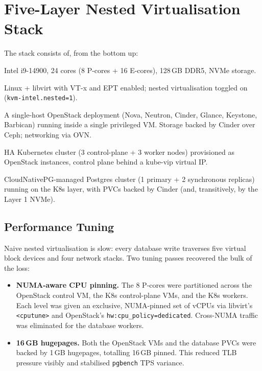 \documentclass[12pt,a4paper,oneside]{report}
\begin{document}
\section{Five-Layer Nested Virtualisation Stack}

The stack consists of, from the bottom up:

\begin{description}[leftmargin=*]
    \item[Layer 1 --- Bare metal:] Intel i9-14900, 24 cores (8 P-cores + 16 E-cores), 128\,GB DDR5, NVMe storage.
    \item[Layer 2 --- KVM host:] Linux + libvirt with VT-x and EPT enabled; nested virtualisation toggled on (\texttt{kvm-intel.nested=1}).
    \item[Layer 3 --- OpenStack control plane:] A single-host OpenStack deployment (Nova, Neutron, Cinder, Glance, Keystone, Barbican) running inside a single privileged VM. Storage backed by Cinder over Ceph; networking via OVN.
    \item[Layer 4 --- Kubernetes:] HA Kubernetes cluster (3 control-plane + 3 worker nodes) provisioned as OpenStack instances, control plane behind a kube-vip virtual IP.
    \item[Layer 5 --- PostgreSQL:] CloudNativePG-managed Postgres cluster (1 primary + 2 synchronous replicas) running on the K8s layer, with PVCs backed by Cinder (and, transitively, by the Layer 1 NVMe).
\end{description}

\subsection{Performance Tuning}

Naive nested virtualisation is slow: every database write traverses five virtual block devices and four network stacks. Two tuning passes recovered the bulk of the loss:

\begin{itemize}[leftmargin=*]
    \item \textbf{NUMA-aware CPU pinning.} The 8 P-cores were partitioned across the OpenStack control VM, the K8s control-plane VMs, and the K8s workers. Each level was given an exclusive, NUMA-pinned set of vCPUs via libvirt's \texttt{<cputune>} and OpenStack's \texttt{hw:cpu\_policy=dedicated}. Cross-NUMA traffic was eliminated for the database workers.
    \item \textbf{16\,GB hugepages.} Both the OpenStack VMs and the database PVCs were backed by 1\,GB hugepages, totalling 16\,GB pinned. This reduced TLB pressure visibly and stabilised \texttt{pgbench} TPS variance.
\end{itemize}
\end{document}
